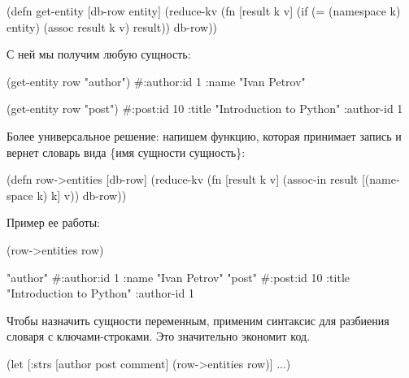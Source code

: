 \begin{english}
  \begin{clojure}
(defn get-entity [db-row entity]
  (reduce-kv
   (fn [result k v]
     (if (= (namespace k) entity)
       (assoc result k v)
       result))
   {}
   db-row))
  \end{clojure}
\end{english}

С ней мы получим любую сущность:

\begin{english}
  \begin{clojure}
(get-entity row "author")
#:author{:id 1 :name "Ivan Petrov"}

(get-entity row "post")
#:post{:id 10
       :title "Introduction to Python"
       :author-id 1}
  \end{clojure}
\end{english}

Более универсальное решение: напишем функцию, которая принимает запись и вернет словарь вида \{имя сущности \arr сущность\}:

\begin{english}
  \begin{clojure}
(defn row->entities [db-row]
  (reduce-kv
   (fn [result k v]
     (assoc-in result [(namespace k) k] v))
   {}
   db-row))
  \end{clojure}
\end{english}

Пример ее работы:

\begin{english}
  \begin{clojure}
(row->entities row)

{"author" #:author{:id 1
                   :name "Ivan Petrov"}
 "post" #:post{:id 10
               :title "Introduction to Python"
               :author-id 1}}
  \end{clojure}
\end{english}

Чтобы назначить сущности переменным, применим синтаксис  для разбиения словаря с ключами-строками. Это значительно экономит код.

\begin{english}
  \begin{clojure}
(let [{:strs [author
              post
              comment]}
      (row->entities row)]
  ...)
  \end{clojure}
\end{english}

